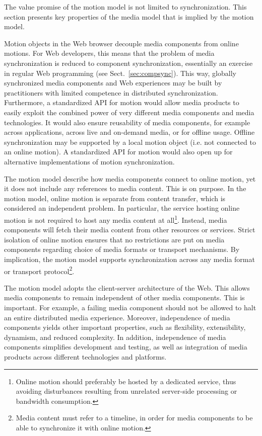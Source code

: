 The value promise of the motion model is not limited to synchronization. This
section presents key properties of the media model that is implied by the
motion model.


Motion objects in the Web browser decouple media components from online
motions. For Web developers, this means that the problem of media
synchronization is reduced to component synchronization, essentially an
exercise in regular Web programming (see Sect.~\ref{sec:compsync}). This way,
globally synchronized media components and Web experiences may be built by
practitioners with limited competence in distributed synchronization.
Furthermore, a standardized API for motion would allow media products to
easily exploit the combined power of very different media components and media
technologies. It would also ensure reusability of media components, for
example across applications, across live and on-demand media, or for offline
usage. Offline synchronization may be supported by a local motion object (i.e.
not connected to an online motion). A standardized API for motion would also
open up for alternative implementations of motion synchronization.


The motion model describe how media components connect to online motion, yet
it does not include any references to media content. This is on purpose. In
the motion model, online motion is separate from content transfer, which is
considered an independent problem. In particular, the service hosting online
motion is not required to host any media content at all\footnote{Online motion
should preferably be hosted by a dedicated service, thus avoiding disturbances
resulting from unrelated server-side processing or bandwidth consumption.}.
Instead, media components will fetch their media content from other resources
or services. Strict isolation of online motion ensures that no restrictions
are put on media components regarding choice of media formats or transport
mechanisms. By implication, the motion model supports synchronization across
any media format or transport protocol\footnote{Media content must refer to a
timeline, in order for media components to be able to synchronize it with
online motion.}.


The motion model adopts the client-server architecture of the Web. This allows
media components to remain independent of other media components. This is
important. For example, a failing media component should not be allowed to
halt an entire distributed media experience. Moreover, independence of media
components yields other important properties, such as flexibility,
extensibility, dynamism, and reduced complexity. In addition, independence of
media components simplifies development and testing, as well as integration of
media products across different technologies and platforms.


